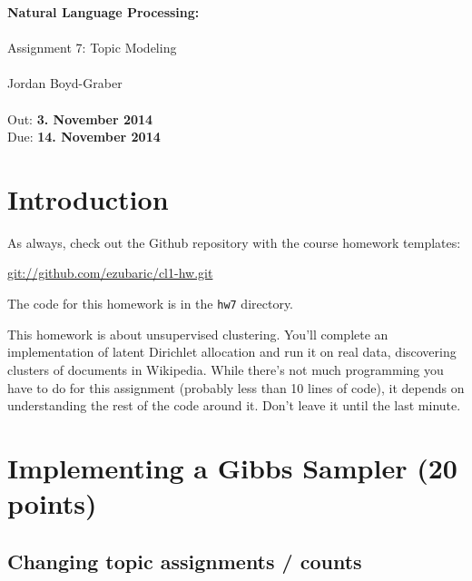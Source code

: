 \documentclass[11pt]{article}
\begin{document}
\begin{center}
{\Large{\textbf{ Natural Language Processing:  }}}\\
\mbox{}\\
{\Large{Assignment 7: Topic Modeling}}\\
\mbox{}\\
{\large{Jordan Boyd-Graber}}\\
\mbox{}\\
{\large{Out: \textbf{3. November 2014}\\Due: \textbf{14. November 2014}}}\\
\end{center}


{}

\section*{Introduction} %
\label{sec:introduction}
As always, check out the Github repository with the course homework templates:

\url{git://github.com/ezubaric/cl1-hw.git}

The code for this homework is in the \texttt{hw7} directory.

This homework is about unsupervised clustering.  You'll complete an implementation of latent Dirichlet allocation and run it on real data, discovering clusters of documents in Wikipedia.  While there's not much programming you have to do for this assignment (probably less than 10 lines of code), it depends on understanding the rest of the code around it.  Don't leave it until the last minute.

\section{Implementing a Gibbs Sampler (20 points)}

\subsection{Changing topic assignments / counts}
\end{document}
